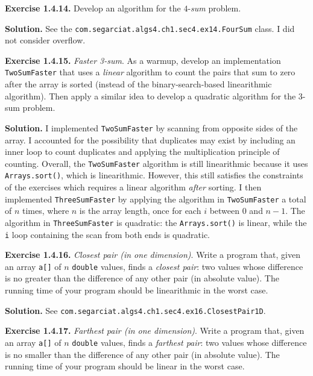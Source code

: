\documentclass[12pt, a4paper]{article}
\newenvironment{ex}[2][Exercise]
{\par\medskip\noindent \textbf{#1 #2.}}
{\medskip}
\newenvironment{sol}[1][Solution]
{\par\medskip\noindent \textbf{#1.} }
{\medskip}
\begin{document}
	\begin{ex}{1.4.14}
		Develop an algorithm for the $4$-\emph{sum} problem.
	\end{ex}
	\begin{sol}
		See the \texttt{com.segarciat.algs4.ch1.sec4.ex14.FourSum} class. I did not consider
		overflow.
	\end{sol}
	\begin{ex}{1.4.15}
		\emph{Faster 3-sum}. As a warmup, develop an implementation \texttt{TwoSumFaster} that
		uses a \emph{linear} algorithm to count the pairs that sum to zero after the array
		is sorted (instead of the binary-search-based linearithmic algorithm). Then apply
		a similar idea to develop a quadratic algorithm for the 3-sum problem.
	\end{ex}
	\begin{sol}
		I implemented \texttt{TwoSumFaster} by scanning from opposite sides of the array.
		I accounted for the possibility that duplicates may exist by including an inner
		loop to count duplicates and applying the multiplication principle of counting.
		Overall, the \texttt{TwoSumFaster} algorithm is still linearithmic because
		it uses \texttt{Arrays.sort()}, which is linearithmic. However, this still satisfies
		the constraints of the exercises which requires a linear algorithm \emph{after} sorting.
		I then implemented \texttt{ThreeSumFaster} by applying the algorithm in
		\texttt{TwoSumFaster} a total of $n$ times, where $n$ is the array length,
		once for each $i$ between $0$ and $n-1$. The algorithm in \texttt{ThreeSumFaster}
		is quadratic: the \texttt{Arrays.sort()} is linear, while the \texttt{i} loop
		containing the scan from both ends is quadratic.
	\end{sol}
	\begin{ex}{1.4.16}
		\emph{Closest pair (in one dimension)}. Write a program that, given an array \texttt{a[]}
		of $n$ \texttt{double} values, finds a \emph{closest pair}: two values whose difference
		is no greater than the difference of any other pair (in absolute value). The running time
		of your program should be linearithmic in the worst case.
	\end{ex}
	\begin{sol}
		See \texttt{com.segarciat.algs4.ch1.sec4.ex16.ClosestPair1D}.
	\end{sol}
	\begin{ex}{1.4.17}
		\emph{Farthest pair (in one dimension)}. Write a program that, given an array \texttt{a[]}
		of $n$ \texttt{double} values, finds a \emph{farthest pair}: two values whose difference is
		no smaller than the difference of any other pair (in absolute value). The running time
		of your program should be linear in the worst case.
	\end{ex}
\end{document}
